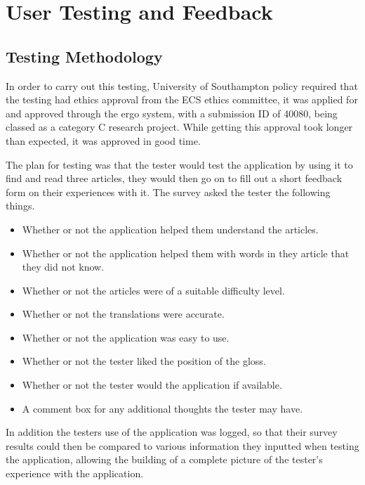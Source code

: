 \chapter{User Testing and Feedback}

\section{Testing Methodology}

In order to carry out this testing, University of Southampton policy required that the testing had ethics approval from the ECS ethics committee, it was applied for and approved through the ergo system, with a submission ID of 40080, being classed as a category C research project. While getting this approval took longer than expected, it was approved in good time.

The plan for testing was that the tester would test the application by using it to find and read three articles, they would then go on to fill out a short feedback form on their experiences with it. The survey asked the tester the following things. 
\begin{itemize}
	\item Whether or not the application helped them understand the articles.
	
	\item Whether or not the application helped them with words in they article that they did not know.
	
	\item Whether or not the articles were of a suitable difficulty level.
	
	\item Whether or not the translations were accurate.
	
	\item Whether or not the application was easy to use.
	
	\item Whether or not the tester liked the position of the gloss.
	
	\item Whether or not the tester would the application if available. 
	
	\item A comment box for any additional thoughts the tester may have. 
\end{itemize}


In addition the testers use of the application was logged, so that their survey results could then be compared to various information they inputted when testing the application, allowing the building of a complete picture of the tester's experience with the application. 

